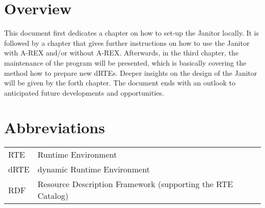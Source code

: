 \section{Overview}

This document first dedicates a chapter on how to set-up the Janitor
locally. It is followed by a chapter that gives further instructions on
how to use the Janitor with A-REX and/or without A-REX. Afterwards, in the
third chapter, the maintenance of the program will be presented, which is
basically covering the method how to prepare new dRTEs. Deeper insights on
the design of the Janitor will be given by the forth chapter. The document
ends with an outlook to anticipated future developments and opportunities.

\section*{Abbreviations}

\begin{tabular}{l@{--}p{150mm}}
RTE&Runtime Environment\\
dRTE&dynamic Runtime Environment\\
RDF&Resource Description Framework (supporting the RTE Catalog)\\
\end{tabular}






 


